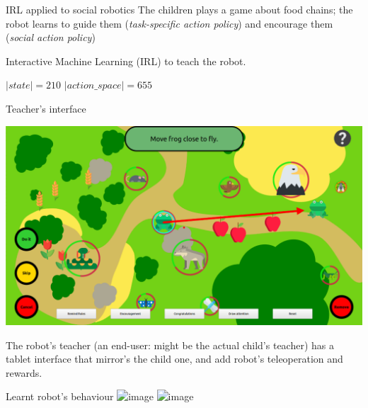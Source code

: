 \documentclass[xcolor=table]{beamer}
\begin{document}
{\begin{frame}{IRL applied to social robotics}
    The children plays a game about food chains; the robot learns to guide them
    (\emph{task-specific action policy}) and encourage them (\emph{social action
    policy})

    Interactive Machine Learning (IRL) to teach the robot.

    $|state| = 210$ $| action\_space| = 655$

\end{frame}


\begin{frame}{Teacher's interface}
    \begin{center}
        \includegraphics[width=0.9\linewidth]{sparc/woz-gui}
    \end{center}

    The robot's teacher (an end-user: might be the actual child's teacher) has a
    tablet interface that mirror's the child one, and add robot's teleoperation
    and rewards.

\end{frame}




\begin{frame}{Learnt robot's behaviour}
    \includegraphics<1>[width=0.9\linewidth]{sparc/actions-supervised}
    \includegraphics<2>[width=0.9\linewidth]{sparc/actions}


\end{frame}}
\end{document}
